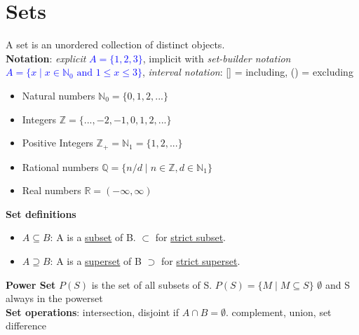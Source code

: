\section*{Sets}
A set is an unordered collection of distinct objects. \\
\textbf{Notation}: \textit{explicit} \textcolor{blue}{$A = \{1, 2, 3\}$}, implicit with \textit{set-builder notation} \textcolor{blue}{$A = \{x \mid x \in \mathbb{N}_0 \text{ and } 1 \leq x \leq 3\}$}, \textit{interval notation}: [] = including, () = excluding
\begin{itemize}[noitemsep,topsep=0pt,leftmargin=*]
    \item Natural numbers $\mathbb{N}_0 = \{0, 1, 2, ...\}$ 
    \item Integers $\mathbb{Z} = \{..., -2, -1, 0, 1, 2, ...\}$     
    \item Positive Integers $\mathbb{Z}_+ = \mathbb{N}_1 = \{1, 2, ...\}$ 
    \item Rational numbers $\mathbb{Q} = \{n/d \mid n \in \mathbb{Z}, d \in \mathbb{N}_1\}$
    \item Real numbers $\mathbb{R} = (-\infty, \infty)$  
\end{itemize}
\textbf{Set definitions}
\begin{itemize}[noitemsep,topsep=0pt,leftmargin=*]
    \item $A \subseteq B$: A is a \underline{subset} of B. $\subset$ for \underline{strict subset}.
    \item $A \supseteq B$: A is a \underline{superset} of B $\supset$ for \underline{strict superset}.
\end{itemize} 
\textbf{Power Set} $P(S)$ is the set of all subsets of S. $P(S) = \{ M \mid M \subseteq S\}$ $\emptyset$ and S always in the powerset \\
\textbf{Set operations}: intersection, disjoint if $A \cap B = \emptyset$. complement, union, set difference \\ %
